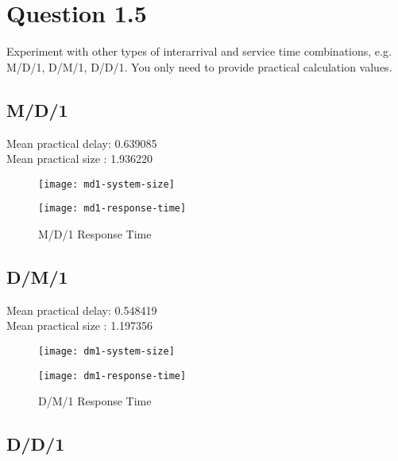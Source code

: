 \documentclass{article}
\newenvironment{homeworkProblem}[1]{
	\section*{#1}
	}{
}
\newenvironment{homeworkSection}[1]{
	\subsection*{#1}
	}{
}
\begin{document}
\begin{homeworkProblem}{Question 1.5}
Experiment with other types of interarrival and service time combinations, e.g. M/D/1, D/M/1, D/D/1. You only need to provide practical calculation values.


\begin{homeworkSection}{M/D/1}

Mean practical delay: 0.639085\\
Mean practical size : 1.936220

\begin{figure}[H]
\begin{minipage}[t]{0.5\linewidth}
\centering
\texttt{[image: md1-system-size]}
\caption{M/D/1 System Size}
\label{md1-system-size}
\end{minipage}
\begin{minipage}[t]{0.5\linewidth}
\centering
\texttt{[image: md1-response-time]}
\caption{M/D/1 Response Time}
\label{md1-response-time}
\end{minipage}
\end{figure}

\end{homeworkSection}


\begin{homeworkSection}{D/M/1}

Mean practical delay: 0.548419\\
Mean practical size : 1.197356

\begin{figure}[H]
\begin{minipage}[t]{0.5\linewidth}
\centering
\texttt{[image: dm1-system-size]}
\caption{D/M/1 System Size}
\label{dm1-system-size}
\end{minipage}
\begin{minipage}[t]{0.5\linewidth}
\centering
\texttt{[image: dm1-response-time]}
\caption{D/M/1 Response Time}
\label{dm1-response-time}
\end{minipage}
\end{figure}

\end{homeworkSection}


\begin{homeworkSection}{D/D/1}


\end{homeworkSection}
\end{homeworkProblem}
\end{document}
